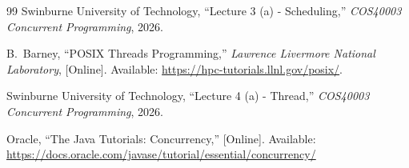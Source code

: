 \documentclass[conference]{IEEEtran}
\begin{document}
\begin{thebibliography}{99}
Swinburne University of Technology, ``Lecture 3 (a) - Scheduling,'' \emph{COS40003 Concurrent Programming}, 2026.

B.~Barney, ``POSIX Threads Programming,'' \emph{Lawrence Livermore National Laboratory}, [Online]. Available: \url{https://hpc-tutorials.llnl.gov/posix/}.

Swinburne University of Technology, ``Lecture 4 (a) - Thread,'' \emph{COS40003 Concurrent Programming}, 2026.

Oracle, ``The Java Tutorials: Concurrency,'' [Online]. Available: \url{https://docs.oracle.com/javase/tutorial/essential/concurrency/}

\end{thebibliography}
\end{document}
